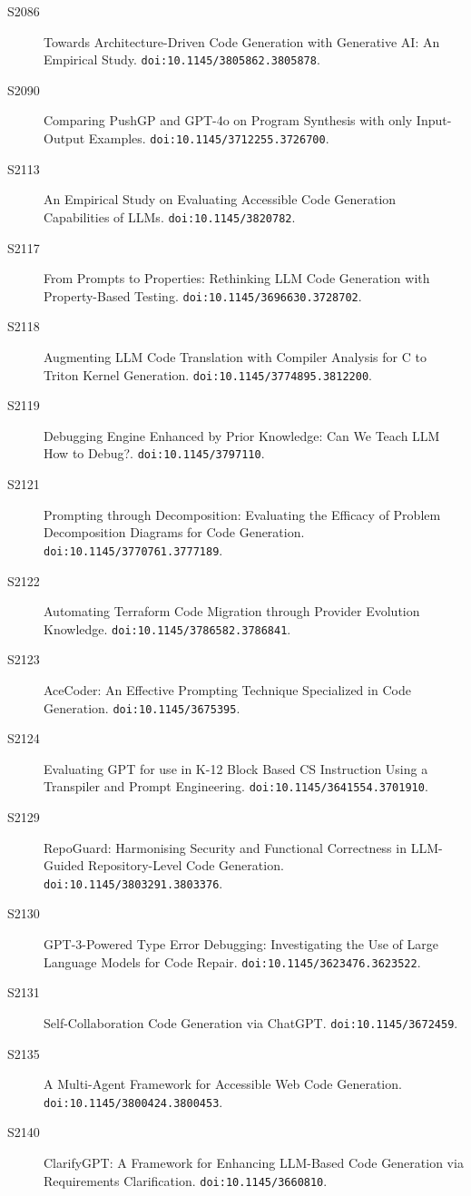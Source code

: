 {\begin{description}
\item[S2086] Towards Architecture-Driven Code Generation with Generative AI: An Empirical Study. \texttt{doi:10.1145/3805862.3805878}.
\item[S2090] Comparing PushGP and GPT-4o on Program Synthesis with only Input-Output Examples. \texttt{doi:10.1145/3712255.3726700}.
\item[S2113] An Empirical Study on Evaluating Accessible Code Generation Capabilities of LLMs. \texttt{doi:10.1145/3820782}.
\item[S2117] From Prompts to Properties: Rethinking LLM Code Generation with Property-Based Testing. \texttt{doi:10.1145/3696630.3728702}.
\item[S2118] Augmenting LLM Code Translation with Compiler Analysis for C to Triton Kernel Generation. \texttt{doi:10.1145/3774895.3812200}.
\item[S2119] Debugging Engine Enhanced by Prior Knowledge: Can We Teach LLM How to Debug?. \texttt{doi:10.1145/3797110}.
\item[S2121] Prompting through Decomposition: Evaluating the Efficacy of Problem Decomposition Diagrams for Code Generation. \texttt{doi:10.1145/3770761.3777189}.
\item[S2122] Automating Terraform Code Migration through Provider Evolution Knowledge. \texttt{doi:10.1145/3786582.3786841}.
\item[S2123] AceCoder: An Effective Prompting Technique Specialized in Code Generation. \texttt{doi:10.1145/3675395}.
\item[S2124] Evaluating GPT for use in K-12 Block Based CS Instruction Using a Transpiler and Prompt Engineering. \texttt{doi:10.1145/3641554.3701910}.
\item[S2129] RepoGuard: Harmonising Security and Functional Correctness in LLM-Guided Repository-Level Code Generation. \texttt{doi:10.1145/3803291.3803376}.
\item[S2130] GPT-3-Powered Type Error Debugging: Investigating the Use of Large Language Models for Code Repair. \texttt{doi:10.1145/3623476.3623522}.
\item[S2131] Self-Collaboration Code Generation via ChatGPT. \texttt{doi:10.1145/3672459}.
\item[S2135] A Multi-Agent Framework for Accessible Web Code Generation. \texttt{doi:10.1145/3800424.3800453}.
\item[S2140] ClarifyGPT: A Framework for Enhancing LLM-Based Code Generation via Requirements Clarification. \texttt{doi:10.1145/3660810}.

\end{description}}
